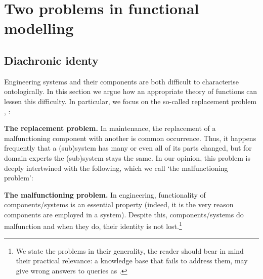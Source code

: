 \documentclass[
]{ceurart}
\begin{document}
\section{Two problems in functional modelling}

\subsection{Diachronic identy}\label{subsec:identity}
Engineering systems and their components are both difficult to characterise ontologically. %
In this section we argue how an appropriate theory of functions can lessen this difficulty.%
In particular, we focus on the so-called replacement problem \cite{guarinoArtefactualSystemsMissing2014},  \cite[Chapter 14]{westDevelopingHighQuality2011}:
\bflist
\item[\mypb{replacement}] \textbf{The replacement problem.} In maintenance, the replacement of a malfunctioning component
with another is common occurrence. Thus, it happens frequently that a (sub)system has many or even all of its parts changed, but for domain experts the (sub)system stays the same. 
\eflist
In our opinion, this problem is deeply intertwined with the following, which we call `the malfunctioning problem':
\bflist
\item[\mypb{malfunctioning}] \textbf{The malfunctioning problem.} In engineering, functionality of components/systems is an essential property (indeed, it is the very reason components are employed in a system). Despite this, components/systems do malfunction and when they do, their identity is not lost.\footnote{We state the problems in their generality, the reader should bear in mind their practical relevance: a knowledge base that fails to address them, may give wrong answers to queries as .} 
\end{document}

